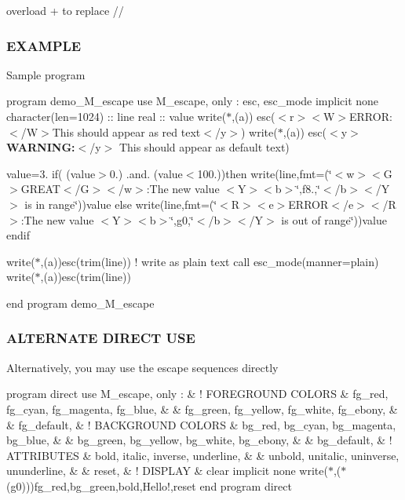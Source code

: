 overload + to replace //

\subsubsection*{E\+X\+A\+M\+P\+LE}

Sample program

program demo\+\_\+\+M\+\_\+escape use M\+\_\+escape, only \+: esc, esc\+\_\+mode implicit none character(len=1024) \+:\+: line real \+:\+: value write($\ast$,\textquotesingle{}(a)\textquotesingle{}) esc(\textquotesingle{}$<$r$>$$<$\+W$>$E\+R\+R\+OR\+:$<$/\+W$>$This should appear as red text$<$/y$>$\textquotesingle{}) write($\ast$,\textquotesingle{}(a)\textquotesingle{}) esc(\textquotesingle{}$<$y$>${\bfseries W\+A\+R\+N\+I\+NG\+:}$<$/y$>$ This should appear as default text\textquotesingle{})

value=3. if( (value$>$0.) .and. (value$<$100.))then write(line,fmt=\textquotesingle{}(\char`\"{}$<$w$>$$<$\+G$>$\+G\+R\+E\+A\+T$<$/\+G$>$$<$/w$>$\+:\+The new value $<$\+Y$>$$<$b$>$\char`\"{},f8.,\char`\"{}$<$/b$>$$<$/\+Y$>$ is in range\char`\"{})\textquotesingle{})value else write(line,fmt=\textquotesingle{}(\char`\"{}$<$\+R$>$$<$e$>$\+E\+R\+R\+O\+R$<$/e$>$$<$/\+R$>$\+:\+The new value $<$\+Y$>$$<$b$>$\char`\"{},g0,\char`\"{}$<$/b$>$$<$/\+Y$>$ is out of range\char`\"{})\textquotesingle{})value endif

write($\ast$,\textquotesingle{}(a)\textquotesingle{})esc(trim(line)) ! write as plain text call esc\+\_\+mode(manner=\textquotesingle{}plain\textquotesingle{}) write($\ast$,\textquotesingle{}(a)\textquotesingle{})esc(trim(line))

end program demo\+\_\+\+M\+\_\+escape

\subsubsection*{A\+L\+T\+E\+R\+N\+A\+TE D\+I\+R\+E\+CT U\+SE}

Alternatively, you may use the escape sequences directly

program direct use M\+\_\+escape, only \+: \& ! F\+O\+R\+E\+G\+R\+O\+U\+ND C\+O\+L\+O\+RS \& fg\+\_\+red, fg\+\_\+cyan, fg\+\_\+magenta, fg\+\_\+blue, \& \& fg\+\_\+green, fg\+\_\+yellow, fg\+\_\+white, fg\+\_\+ebony, \& \& fg\+\_\+default, \& ! B\+A\+C\+K\+G\+R\+O\+U\+ND C\+O\+L\+O\+RS \& bg\+\_\+red, bg\+\_\+cyan, bg\+\_\+magenta, bg\+\_\+blue, \& \& bg\+\_\+green, bg\+\_\+yellow, bg\+\_\+white, bg\+\_\+ebony, \& \& bg\+\_\+default, \& ! A\+T\+T\+R\+I\+B\+U\+T\+ES \& bold, italic, inverse, underline, \& \& unbold, unitalic, uninverse, ununderline, \& \& reset, \& ! D\+I\+S\+P\+L\+AY \& clear implicit none write($\ast$,\textquotesingle{}($\ast$(g0))\textquotesingle{})fg\+\_\+red,bg\+\_\+green,bold,\textquotesingle{}Hello!\textquotesingle{},reset end program direct

